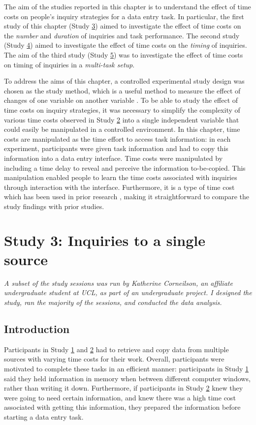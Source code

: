 The aim of the studies reported in this chapter is to understand the effect of time costs on people's inquiry strategies for a data entry task. In particular, the first study of this chapter (Study \hyperref[st:Study3]{3}) aimed to investigate the effect of time costs on the \textit{number} and \textit{duration} of inquiries and task performance. The second study (Study \hyperref[st:Study4]{4}) aimed to investigate the effect of time costs on the \textit{timing} of inquiries. The aim of the third study (Study \hyperref[st:Study5]{5}) was to investigate the effect of time costs on timing of inquiries in a \textit{multi-task setup}.

To address the aims of this chapter, a controlled experimental study design was chosen as the study method, which is a useful method to measure the effect of changes of one variable on another variable \citep{Cairns2008}. To be able to study the effect of time costs on inquiry strategies, it was necessary to simplify the complexity of various time costs observed in Study \hyperref[st:Study2]{2} into a single independent variable that could easily be manipulated in a controlled environment. In this chapter, time costs are manipulated as the time effort to access task information: in each experiment, participants were given task information and had to copy this information into a data entry interface. Time costs were manipulated by including a time delay to reveal and perceive the information to-be-copied. This manipulation enabled people to learn the time costs associated with inquiries through interaction with the interface. Furthermore, it is a type of time cost which has been used in prior research \citep[e.g.][]{Gray2006, Morgan2009}, making it straightforward to compare the study findings with prior studies.

\section{Study 3: Inquiries to a single source}\label{st:Study3}

\textit{A subset of the study sessions was run by Katherine Corneilson, an affiliate undergraduate student at UCL, as part of an undergraduate project. I designed the study, ran the majority of the sessions, and conducted the data analysis.}

\subsection{Introduction}
Participants in Study \hyperref[st:Study1]{1} and \hyperref[st:Study2]{2} had to retrieve and copy data from multiple sources with varying time costs for their work. Overall, participants were motivated to complete these tasks in an efficient manner: participants in Study  \hyperref[st:Study1]{1} said they held information in memory when between different computer windows, rather than writing it down. Furthermore, if participants in Study \hyperref[st:Study2]{2} knew they were going to need certain information, and knew there was a high time cost associated with getting this information, they prepared the information before starting a data entry task. 

